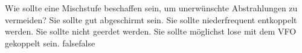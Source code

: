     {Wie sollte eine Mischstufe beschaffen sein, um unerwünschte Abstrahlungen zu vermeiden?}
    {Sie sollte gut abgeschirmt sein.}
    {Sie sollte niederfrequent entkoppelt werden.}
    {Sie sollte nicht geerdet werden.}
    {Sie sollte möglichst lose mit dem VFO gekoppelt sein. }
    {false}{false}